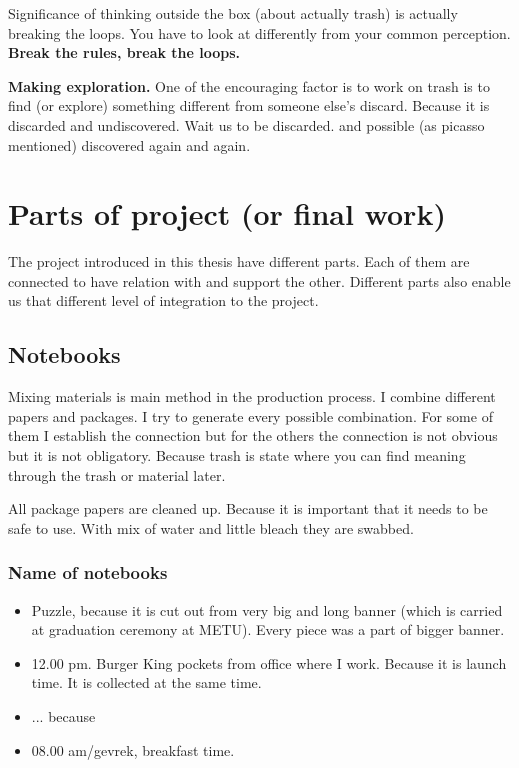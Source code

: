 Significance of thinking outside the box (about actually trash) is actually breaking the loops. You have to look at differently from your common perception. \textbf{Break the rules, break the loops.}

\textbf{Making exploration.} One of the encouraging factor is to work on trash is to find (or explore) something different from someone else's discard. Because it is discarded and undiscovered. Wait us to be discarded. and possible (as picasso mentioned) discovered again and again. 

\section{Parts of project (or final work)}
The project introduced in this thesis have different parts. Each of them are connected to have relation with and support the other. Different parts also enable us that different level of integration to the project. 

\subsection{Notebooks}
Mixing materials is main method in the production process. I combine different papers and packages. I try to generate every possible combination. For some of them I establish the connection but for the others the connection is not obvious but it is not obligatory. Because trash is state where you can find meaning through the trash or material later. 

All package papers are cleaned up. Because it is important that it needs to be safe to use. With mix of water and little bleach they are swabbed. 

\subsubsection{Name of notebooks}
\begin{itemize}
\item Puzzle, because it is cut out from very big and long banner (which is carried at graduation ceremony at METU). Every piece was a part of bigger banner. 
\item 12.00 pm. Burger King pockets from office where I work. Because it is launch time. It is collected at the same time.
\item ... because 
\item 08.00 am/gevrek, breakfast time. 
\end{itemize}

